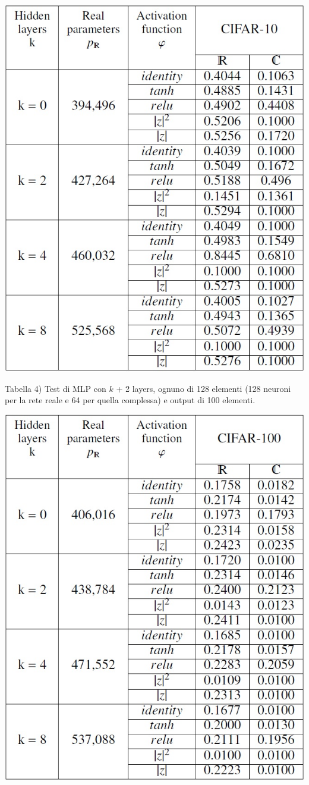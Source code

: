 \documentclass[a4paper,10pt]{article}
\begin{document}
\includegraphics[width=%
\textwidth]{tabella3}


Tabella 4) Test di MLP con $k$ + 2 layers, ognuno di 128 elementi (128 neuroni per la rete reale e 64 per quella complessa) e output di 100 elementi.

\includegraphics[width=%
\textwidth]{tabella4}
\end{document}
